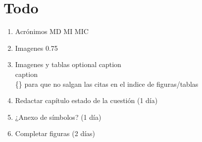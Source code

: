 \documentclass[final, 12pt, oneside]{class_diss}
\begin{document}
\section*{Todo}
\begin{enumerate}
  \item Acrónimos MD MI MIC
  \item Imagenes 0.75
  \item Imagenes y tablas optional caption \\caption\[\]\{\} para que no salgan las citas en el indice de figuras/tablas
  \item Redactar capítulo estado de la cuestión (1 día)
  \item ¿Anexo de símbolos? (1 día)
  \item Completar figuras (2 días)
\end{enumerate}

\setcounter{page}{-1}







\vfill

\newpage
{}
\setcounter{page}{1}

{}

\tableofcontents
\listoffigures
\listoftables

\newpage
{}
\setcounter{page}{1}




% 
% 

% 


\nocite{*}



\appendix

\end{document}
